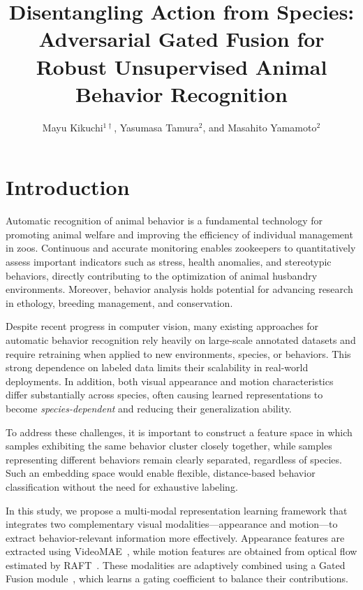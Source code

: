 \documentclass[fleqn,10pt,twocolumn]{AROB}
\title{Disentangling Action from Species: Adversarial Gated Fusion for Robust Unsupervised Animal Behavior Recognition }
\author{Mayu Kikuchi$^{1\dagger}$, Yasumasa Tamura$^{2}$, and Masahito Yamamoto$^{2}$}
\begin{document}
\maketitle


\section{Introduction}


Automatic recognition of animal behavior is a fundamental technology for promoting animal welfare and improving the efficiency of individual management in zoos. Continuous and accurate monitoring enables zookeepers to quantitatively assess important indicators such as stress, health anomalies, and stereotypic behaviors, directly contributing to the optimization of animal husbandry environments. Moreover, behavior analysis holds potential for advancing research in ethology, breeding management, and conservation.

Despite recent progress in computer vision, many existing approaches for automatic behavior recognition rely heavily on large-scale annotated datasets and require retraining when applied to new environments, species, or behaviors. This strong dependence on labeled data limits their scalability in real-world deployments. In addition, both visual appearance and motion characteristics differ substantially across species, often causing learned representations to become \emph{species-dependent} and reducing their generalization ability.

To address these challenges, it is important to construct a feature space in which samples exhibiting the same behavior cluster closely together, while samples representing different behaviors remain clearly separated, regardless of species. Such an embedding space would enable flexible, distance-based behavior classification without the need for exhaustive labeling.

In this study, we propose a multi-modal representation learning framework that integrates two complementary visual modalities—appearance and motion—to extract behavior-relevant information more effectively. Appearance features are extracted using VideoMAE~\cite{videomae}, while motion features are obtained from optical flow estimated by RAFT~\cite{raft}. These modalities are adaptively combined using a Gated Fusion module~\cite{ren2018gatedfusionnetworksingle}, which learns a gating coefficient to balance their contributions.
\end{document}
